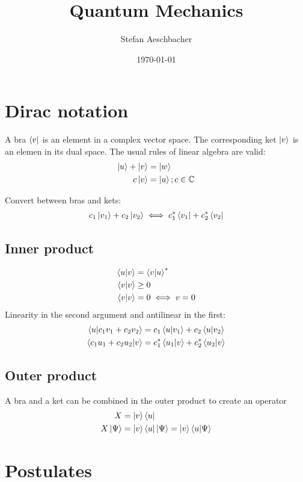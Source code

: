 \documentclass[10pt,a4paper]{book}
\title{Quantum Mechanics}
\author{Stefan Aeschbacher}
\date{\today}
\begin{document}
\maketitle


\chapter{Dirac notation}
A bra $\bra{v}$ is an element in a complex vector space. The corresponding ket $\ket{v}$ is an elemen in its dual space.
The usual rules of linear algebra are valid:
\begin{align}
	\ket{u} + \ket{v} & = \ket{w} \\
	c\ket{v} &= \ket{u}; c \in \mathbb{C}
\end{align}

Convert between bras and kets:
\begin{align}
	c_1 \ket{v_1} + c_2 \ket{v_2} \iff c_1^* \bra{v_1} + c_2^* \bra{v_2}
\end{align}

\section{Inner product}
\begin{align}
	\braket{u|v} & = \braket{v|u}^* \\
	\braket{v|v} & \ge 0 \\
	\braket{v|v} &= 0 \iff v = 0
\end{align}
Linearity in the second argument and antilinear in the first:
\begin{align}
	\braket{u|c_1 v_1 + c_2 v_2} & = c_1\braket{u|v_1} + c_2\braket{u|v_2} \\
	\braket{c_1 u_1 + c_2 u_2|v} & = c_1^*\braket{u_1|v} + c_2^*\braket{u_2|v} \\
\end{align}

\section{Outer product}
A bra and a ket can be combined in the outer product to create an operator
\textbf{\begin{align}
	X &= \ket{v}\bra{u} \\
	X\ket{\Psi} &= \ket{v}\bra{u}\ket{\Psi} = \ket{v}\braket{u|\Psi}  \\
\end{align}
}

\chapter{Postulates}
\end{document}
